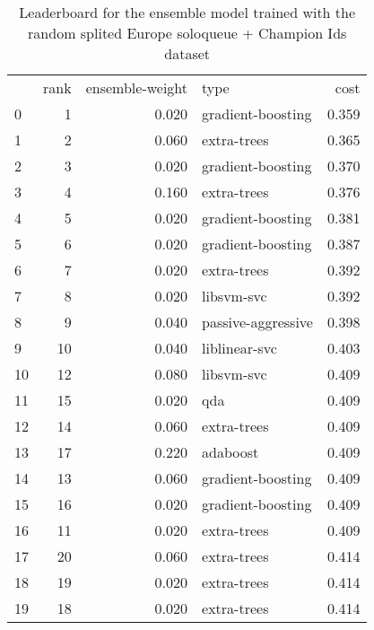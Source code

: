 \begin{table}[]
	\centering
	\begin{tabular}{lrrlr}
		   & rank & ensemble-weight & type               & cost  \\
		0  & 1    & 0.020           & gradient-boosting  & 0.359 \\
		1  & 2    & 0.060           & extra-trees        & 0.365 \\
		2  & 3    & 0.020           & gradient-boosting  & 0.370 \\
		3  & 4    & 0.160           & extra-trees        & 0.376 \\
		4  & 5    & 0.020           & gradient-boosting  & 0.381 \\
		5  & 6    & 0.020           & gradient-boosting  & 0.387 \\
		6  & 7    & 0.020           & extra-trees        & 0.392 \\
		7  & 8    & 0.020           & libsvm-svc         & 0.392 \\
		8  & 9    & 0.040           & passive-aggressive & 0.398 \\
		9  & 10   & 0.040           & liblinear-svc      & 0.403 \\
		10 & 12   & 0.080           & libsvm-svc         & 0.409 \\
		11 & 15   & 0.020           & qda                & 0.409 \\
		12 & 14   & 0.060           & extra-trees        & 0.409 \\
		13 & 17   & 0.220           & adaboost           & 0.409 \\
		14 & 13   & 0.060           & gradient-boosting  & 0.409 \\
		15 & 16   & 0.020           & gradient-boosting  & 0.409 \\
		16 & 11   & 0.020           & extra-trees        & 0.409 \\
		17 & 20   & 0.060           & extra-trees        & 0.414 \\
		18 & 19   & 0.020           & extra-trees        & 0.414 \\
		19 & 18   & 0.020           & extra-trees        & 0.414 \\
	\end{tabular}

	\caption{Leaderboard for the ensemble model trained with the random splited Europe soloqueue + Champion Ids dataset}
	\label{tab:lb-europe-games-full-champid-randsplit}
\end{table}

